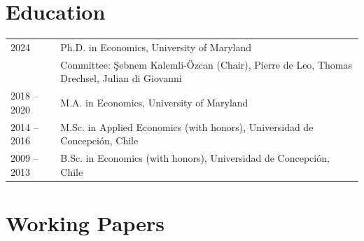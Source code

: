 \documentclass[10pt]{article}
\begin{document}
\section*{Education}
%

\begin{tabular}{@{}p{1.8cm}p{13cm}}
    2024 & Ph.D. in Economics, University of Maryland\\
   & \small Committee: \c{S}ebnem Kalemli-\"{O}zcan (Chair), Pierre de Leo, Thomas Drechsel, Julian di Giovanni\\
    2018 -- 2020 & M.A. in Economics, University of Maryland\\
    2014 -- 2016 & M.Sc. in Applied Economics (with honors), Universidad de Concepci\'on, Chile\\
    2009 -- 2013 & B.Sc. in Economics (with honors), Universidad de Concepci\'on, Chile
\end{tabular}


\section*{Working Papers}
\end{document}
